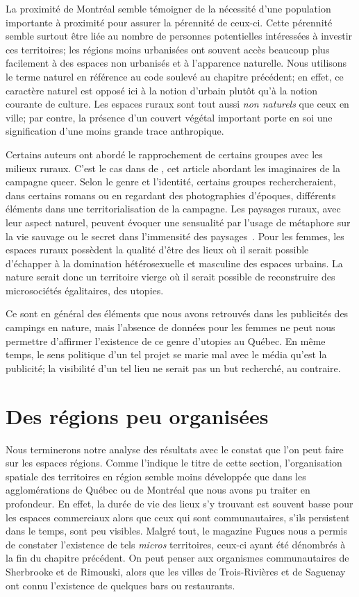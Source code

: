 La proximité de Montréal semble témoigner de la nécessité d'une population importante à proximité pour assurer la pérennité de ceux-ci.
Cette pérennité semble surtout être liée au nombre de personnes potentielles intéressées à investir ces territoires; les régions moins urbanisées ont souvent accès beaucoup plus facilement à des espaces non urbanisés et à l'apparence naturelle.
Nous utilisons le terme naturel en référence au code soulevé au chapitre précédent; en effet, ce caractère naturel est opposé ici à la notion d'urbain plutôt qu'à la notion courante de culture.
Les espaces ruraux sont tout aussi \emph{non naturels} que ceux en ville; par contre, la présence d'un couvert végétal important porte en soi une signification d'une moins grande trace anthropique.

Certains auteurs ont abordé le rapprochement de certains groupes \lgbt{} avec les milieux ruraux.
C'est le cas dans  de \citeauthor{Bell1995a}, cet article abordant les imaginaires de la campagne queer.
Selon le genre et l'identité, certains groupes rechercheraient, dans certains romans ou en regardant des photographies d'époques, différents éléments dans une territorialisation de la campagne.
Les paysages ruraux, avec leur aspect naturel, peuvent évoquer une sensualité par l'usage de métaphore sur la vie sauvage ou le secret dans l'immensité des paysages~\citep[114]{Bell1995a}.
Pour les femmes, les espaces ruraux possèdent la qualité d'être des lieux où il serait possible d'échapper à la domination hétérosexuelle et masculine des espaces urbains.
La nature serait donc un territoire vierge où il serait possible de reconstruire des microsociétés égalitaires, des utopies.

Ce sont en général des éléments que nous avons retrouvés dans les publicités des campings en nature, mais l'absence de données pour les femmes ne peut nous permettre d'affirmer l'existence de ce genre d'utopies au Québec.
En même temps, le sens politique d'un tel projet se marie mal avec le média qu'est la publicité; la visibilité d'un tel lieu ne serait pas un but recherché, au contraire.

\section{Des régions peu organisées}
\label{sec:des_regions_peu_organisees}
Nous terminerons notre analyse des résultats avec le constat que l'on peut faire sur les espaces régions.
Comme l'indique le titre de cette section, l'organisation spatiale des territoires en région semble moins développée que dans les agglomérations de Québec ou de Montréal que nous avons pu traiter en profondeur.
En effet, la durée de vie des lieux \lgbt{} s'y trouvant est souvent basse pour les espaces commerciaux alors que ceux qui sont communautaires, s'ils persistent dans le temps, sont peu visibles.
Malgré tout, le magazine Fugues nous a permis de constater l'existence de tels \emph{micros} territoires, ceux-ci ayant été dénombrés à la fin du chapitre précédent.
On peut penser aux organismes communautaires de Sherbrooke et de Rimouski, alors que les villes de Trois-Rivières et de Saguenay ont connu l'existence de quelques bars ou restaurants.

